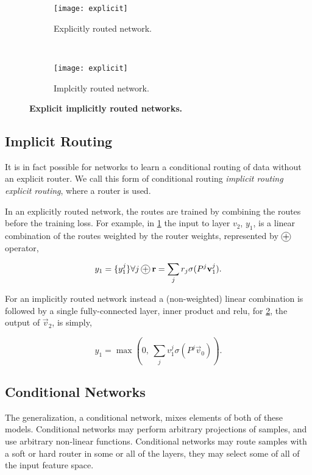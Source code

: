 \documentclass[thesis]{subfiles}
\begin{document}
	
	\begin{figure}[tbp] 
		\centering
		\begin{subfigure}[b]{0.45\textwidth}
			\centering
			\texttt{[image: explicit]}
			\caption{Explicitly routed network.}\label{fig:explicitRouter}
		\end{subfigure}
		~
		\begin{subfigure}[b]{0.45\textwidth}
			\centering
			\texttt{[image: explicit]}
			\caption{Implcitly routed network.}\label{fig:implicitRouter}
		\end{subfigure}
		\caption[Explicit \vs{}implicitly routed networks]{\textbf{Explicit \vs{}implicitly routed networks.}}\label{fig:routerConnections}
	\end{figure}
	
	\subsection{Implicit Routing}
	It is in fact possible for networks to learn a conditional routing of data without an explicit router. We call this form of conditional routing \emph{implicit routing} \vs \emph{explicit routing}, where a router is used. 
	
	In an explicitly routed network, the routes are trained by combining the routes before the training loss. For example, in \cref{fig:explicitRouter} the input to layer $v_2$, $y_1$, is a linear combination of the routes weighted by the router weights, represented by $\circleplus$ operator,
	
	\begin{equation}
	y_1 = \{y_1^j\} \forall j\circleplus \vec r = \sum_j r_j \sigma(P^j \vec v_1^j ).
	\end{equation}
	
	For an implicitly routed network instead a (non-weighted) linear combination is followed by a single fully-connected layer, \ie inner product and \gls{relu}, \ie for \cref{fig:implicitRouter}, the output of $\vec v_2$,  is simply,
	
	\begin{equation}
	y_1 = \max (0, ~\sum_j v_1^j \sigma(P^j \vec v_0) ).
	\end{equation}
	
	\subsection{Conditional Networks}
	The generalization, a conditional network, mixes elements of both of these models. Conditional networks may perform arbitrary projections of samples, and use arbitrary non-linear functions. Conditional networks may route samples with a soft or hard router in some or all of the layers, they may select some of all of the input feature space. 
	
\end{document}
